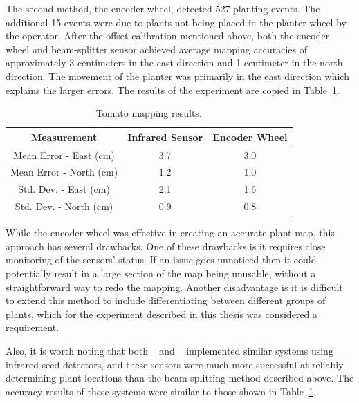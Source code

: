 The second method, the encoder wheel, detected 527 planting events.  The additional 15 events were due to plants not being placed in the planter wheel by the operator.  After the offset calibration mentioned above, both the encoder wheel and beam-splitter sensor achieved average mapping accuracies of approximately 3 centimeters in the east direction and 1 centimeter in the north direction.  The movement of the planter was primarily in the east direction which explains the larger errors.  The results of the experiment are copied in Table~\ref{table:tomato_results}.  

\begin{table}
    \begin{center}
    \caption[Tomato mapping results]{Tomato mapping results.}
    \begin{tabular}[c]{|c|c|c|}
        \hline
        Measurement & Infrared Sensor & Encoder Wheel \\
        \hline
        Mean Error - East (cm)   & 3.7       &  3.0    \\
        Mean Error - North (cm)  & 1.2       & 1.0     \\
        Std. Dev. - East (cm)    & 2.1       & 1.6     \\
        Std. Dev. - North (cm)   & 0.9       & 0.8     \\
        \hline
    \end{tabular}
    \label{table:tomato_results}
   \end{center}
\end{table} 
          
While the encoder wheel was effective in creating an accurate plant map, this approach has several drawbacks. One of these drawbacks is it requires close monitoring of the sensors' status. If an issue goes unnoticed then it could potentially result in a large section of the map being unusable, without a straightforward way to redo the mapping. Another disadvantage is it is difficult to extend this method to include differentiating between different groups of plants, which for the experiment described in this thesis was considered a requirement.
          
Also, it is worth noting that both ~\citep{Nørremark:2007} and ~\citep{Ehsani:2004} implemented similar systems using infrared seed detectors, and these sensors were much more successful at reliably determining plant locations than the beam-splitting method described above.  The accuracy results of these systems were similar to those shown in Table~\ref{table:tomato_results}.
          
